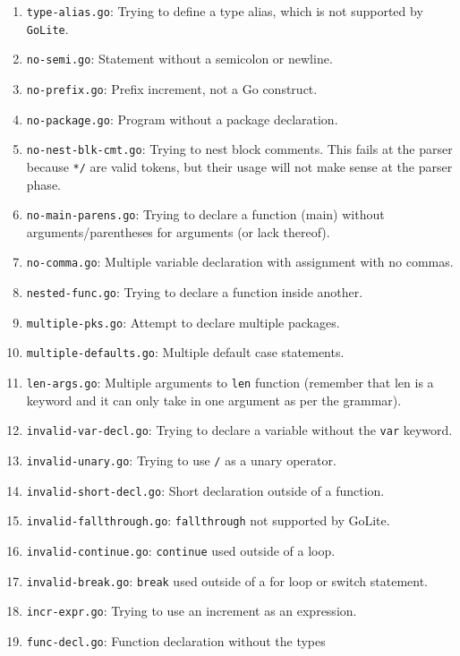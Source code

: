 \documentclass[11pt]{article}
\begin{document}
\begin{enumerate}
\item \texttt{type-alias.go}: Trying to define a type alias, which is
  not supported by \texttt{GoLite}.
\item \texttt{no-semi.go}: Statement without a semicolon or newline.
\item \texttt{no-prefix.go}: Prefix increment, not a Go construct.
\item \texttt{no-package.go}: Program without a package declaration.
\item \texttt{no-nest-blk-cmt.go}: Trying to nest block comments. This
  fails at the parser because \texttt{*/} are valid tokens, but their
  usage will not make sense at the parser phase.
\item \texttt{no-main-parens.go}: Trying to declare a function (main)
  without arguments/parentheses for arguments (or lack thereof).
\item \texttt{no-comma.go}: Multiple variable declaration with
  assignment with no commas.
\item \texttt{nested-func.go}: Trying to declare a function inside
  another.
\item \texttt{multiple-pks.go}: Attempt to declare multiple packages.
\item \texttt{multiple-defaults.go}: Multiple default case statements.
\item \texttt{len-args.go}: Multiple arguments to \texttt{len}
  function (remember that len is a keyword and it can only take in one
  argument as per the grammar).
\item \texttt{invalid-var-decl.go}: Trying to declare a variable
  without the \texttt{var} keyword.
\item \texttt{invalid-unary.go}: Trying to use \texttt{/} as a unary
  operator.
\item \texttt{invalid-short-decl.go}: Short declaration outside of a
  function.
\item \texttt{invalid-fallthrough.go}: \texttt{fallthrough} not
  supported by GoLite.
\item \texttt{invalid-continue.go}: \texttt{continue} used outside of
  a loop.
\item \texttt{invalid-break.go}: \texttt{break} used outside of a for loop
  or switch statement.
\item \texttt{incr-expr.go}: Trying to use an increment as an
  expression.
\item \texttt{func-decl.go}: Function declaration without the types

\end{enumerate}
\end{document}

